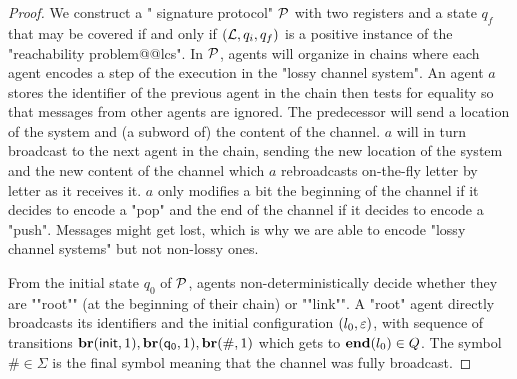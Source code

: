 \begin{proof}
	We construct a " signature protocol" $\mathcal{P}$ with two registers and a state $q_f$ that may be covered if and only if $(\mathcal{L}, q_i, q_f)$ is a positive instance of the "reachability problem@@lcs". In $\mathcal{P}$, agents will organize in chains where each agent encodes a step of the execution in the "lossy channel system". An agent $a$ stores the identifier of the previous agent in the chain then tests for equality so that messages from other agents are ignored. The predecessor will send a location of the system and (a subword of) the content of the channel. $a$ will in turn broadcast to the next agent in the chain, sending the new location of the system and the new content of the channel which $a$ rebroadcasts on-the-fly letter by letter as it receives it. $a$ only modifies a bit the beginning of the channel if it decides to encode a "pop" and the end of the channel if it decides to encode a "push". Messages might get lost, which is why we are able to encode "lossy channel systems" but not non-lossy ones.
	
	\AP From the initial state $q_0$ of $\mathcal{P}$, agents non-deterministically decide whether they are ""root"" (at the beginning of their chain) or ""link"". A "root" agent directly broadcasts its identifiers and the initial configuration $(l_0,\varepsilon)$, with sequence of transitions $\textbf{br}(\mathsf{init}, 1), \textbf{br}(\mathsf{q_0}, 1), \textbf{br}(\mathsf{\#}, 1)$ which gets to $\mathbf{end}(l_0) \in Q$. The symbol $\mathsf{\#} \in \Sigma$ is the final symbol meaning that the channel was fully broadcast. 
	

\end{proof}
